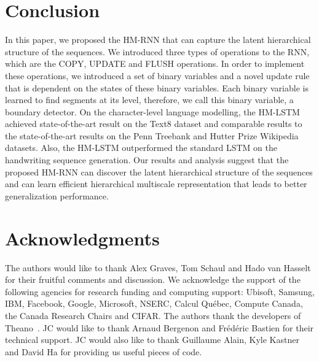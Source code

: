 \documentclass{article} %
\begin{document}
\section{Conclusion}
\label{sec:conclusion}
In this paper, we proposed the HM-RNN that can capture the latent hierarchical structure of the sequences.
We introduced three types of operations to the RNN, which are the COPY, UPDATE and FLUSH operations.
In order to implement these operations, we introduced a set of binary variables and a novel update rule that is dependent on the states of these
binary variables. 
Each binary variable is learned to find segments at its level, therefore, we call this binary variable, a boundary detector.
On the character-level language modelling,
the HM-LSTM achieved state-of-the-art result on the Text8 dataset and 
comparable results to the state-of-the-art results on the Penn Treebank and Hutter Prize Wikipedia datasets.
Also, the HM-LSTM outperformed the standard LSTM on the handwriting sequence generation.
Our results and analysis suggest that the proposed HM-RNN can discover the latent hierarchical structure of the sequences
and can learn efficient hierarchical multiscale representation that leads to better generalization performance.

\section*{Acknowledgments}
\label{sec:ack}
The authors would like to thank Alex Graves, Tom Schaul and Hado van Hasselt for their fruitful comments and discussion.
We acknowledge the support of the following agencies for research funding and
computing support: Ubisoft, Samsung, IBM, Facebook, Google, Microsoft, NSERC, Calcul Qu\'{e}bec, Compute Canada,
the Canada Research Chairs and CIFAR.
The authors thank the developers of Theano~\citep{team2016theano}.
JC would like to thank Arnaud Bergenon and Fr\'ed\'eric Bastien for their technical support.
JC would also like to thank Guillaume Alain, Kyle Kastner and David Ha for providing us useful pieces of code.

{\small


}
\end{document}
